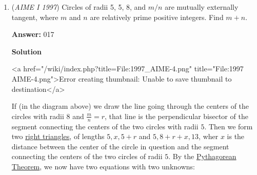 \begin{enumerate}
 



\textbf{Solution 3}

To begin, we rewrite $(10a+b)*(100x+10y+z)*9 = 10000a + 1000b + 100x + 10y + z$

 as

 $(90a+9b-1)(100x+10y+z) = 10000a + 1000b$

 and

 $(90a+9b-1)(100x+10y+z) = 1000(10a + b)$

 
This is the most important part: Notice $(90a+9b-1)$ is $-1 \pmod{10a+b}$ and $1000(10a + b)$ is $0\pmod{10a+b}$. That means $(100x+10y+z)$ is also $0\pmod{10+b}$. Rewrite $(100x+10y+z)$ as $n\times(10a+b)$.

 
$(90a+9b-1)\times n(10a+b)= 1000(10a + b)$
$(90a+9b-1)\times n= 1000$

 
Now we have to find a number that divides 1000 using prime factors 2 or 5 and is $8\pmod9$. It is quick to find there is only one: 125. That gives 14 as $10a+b$ and 112 as $100x+10y+z$. Therefore the answer is $112 + 14 = \boxed{126}$.

 


 -jackshi2006

 


	\item (\textit{AIME I 1997}) Circles of radii 5, 5, 8, and $m/n$ are mutually externally tangent, where $m$ and $n$ are relatively prime positive integers.  Find $m + n.$

 \textbf{Answer: }017



\textbf{Solution}

<a href="/wiki/index.php?title=File:1997\_AIME-4.png" title="File:1997 AIME-4.png">Error creating thumbnail: Unable to save thumbnail to destination</a>

 If (in the diagram above) we draw the line going through the centers of the circles with radii $8$ and $\frac mn = r$, that line is the perpendicular bisector of the segment connecting the centers of the two circles with radii $5$. Then we form two \href{https://artofproblemsolving.com/wiki/index.php?title=Right\_triangles}{right triangles}, of lengths $5, x, 5+r$ and $5, 8+r+x, 13$, wher $x$ is the distance between the center of the circle in question and the segment connecting the centers of the two circles of radii $5$. By the \href{https://artofproblemsolving.com/wiki/index.php?title=Pythagorean\_Theorem}{Pythagorean Theorem}, we now have two equations with two unknowns:


\end{enumerate}
